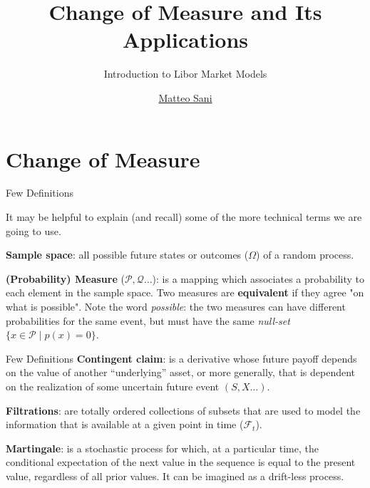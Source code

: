 \documentclass{beamer}
\title{Change of Measure and Its Applications}
\subtitle{Introduction to Libor Market Models}
\author{\href{mailto:matteo.sani@unisi.it}{Matteo Sani}}
\begin{document}
	\begin{frame}[plain]
		\maketitle
	\end{frame}

\section{Change of Measure}
\begin{frame}{Few Definitions}


It may be helpful to explain (and recall) some of the more technical terms we are going to use.\newline

\textbf{Sample space}: all possible future states or outcomes ($\Omega$) of a random process.\newline

\textbf{(Probability) Measure} ($\mathcal{P}, \mathcal{Q}\ldots$): is a mapping which associates a probability to each element in the sample space. Two measures are \textbf{equivalent} if they agree "on what is possible". Note the word \emph{possible}: the two measures can have different probabilities for the same event, but must have the same \emph{null-set} $\{x\in {\mathcal {P}}\mid p (x)=0\}$. 
\end{frame}

\begin{frame}{Few Definitions}
\textbf{Contingent claim}: is a derivative whose future payoff depends on the value of another “underlying” asset, or more generally, that is dependent on the realization of some uncertain future event $(S, X\ldots)$.\newline

\textbf{Filtrations}: are totally ordered collections of subsets that are used to model the information that is available at a given point in time ($\mathcal{F}_t$). \newline

\textbf{Martingale}: is a stochastic process for which, at a particular time, the conditional expectation of the next value in the sequence is equal to the present value, regardless of all prior values. It can be imagined as a drift-less process.
\end{frame}
\end{document}
